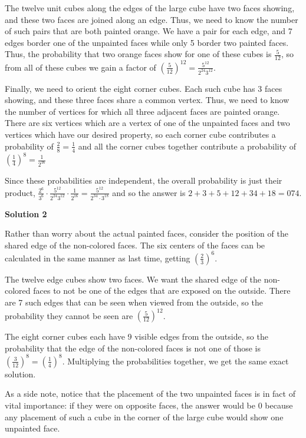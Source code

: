 \begin{enumerate}
 The twelve unit cubes along the edges of the large cube have two faces showing, and these two faces are joined along an edge.  Thus, we need to know the number of such pairs that are both painted orange.  We have a pair for each edge, and 7 edges border one of the unpainted faces while only 5 border two painted faces.  Thus, the probability that two orange faces show for one of these cubes is $\frac{5}{12}$, so from all of these cubes we gain a factor of $\left(\frac{5}{12}\right)^{12} = \frac{5^{12}}{2^{24}3^{12}}$.

 Finally, we need to orient the eight corner cubes.  Each such cube has 3 faces showing, and these three faces share a common vertex.  Thus, we need to know the number of vertices for which all three adjacent faces are painted orange.  There are six vertices which are a vertex of one of the unpainted faces and two vertices which have our desired property, so each corner cube contributes a probability of $\frac{2}{8} = \frac{1}{4}$ and all the corner cubes together contribute a probability of $\left(\frac{1}{4}\right)^8 = \frac{1}{2^{16}}$

 Since these probabilities are independent, the overall probability is just their product, $\frac{2^6}{3^6} \cdot \frac{5^{12}}{2^{24}3^{12}} \cdot \frac{1}{2^{16}} = \frac{5^{12}}{2^{34}\cdot 3^{18}}$ and so the answer is $2 + 3 + 5 + 12 + 34 + 18 = \boxed{074}$.

 



\textbf{Solution 2}

Rather than worry about the actual painted faces, consider the position of the shared edge of the non-colored faces. The six centers of the faces can be calculated in the same manner as last time, getting $\left(\frac{2}{3}\right)^6$. 

 The twelve edge cubes show two faces. We want the shared edge of the non-colored faces to not be one of the edges that are exposed on the outside. There are 7 such edges that can be seen when viewed from the outside, so the probability they cannot be seen are $\left(\frac{5}{12}\right)^{12}$.

 The eight corner cubes each have 9 visible edges from the outside, so the probability that the edge of the non-colored faces is not one of those is $\left(\frac{3}{12}\right)^8 = \left(\frac{1}{4}\right)^8$. Multiplying the probabilities together, we get the same exact solution.  

 As a side note, notice that the placement of the two unpainted faces is in fact of vital importance: if they were on opposite faces, the answer would be 0 because any placement of such a cube in the corner of the large cube would show one unpainted face.


\end{enumerate}
